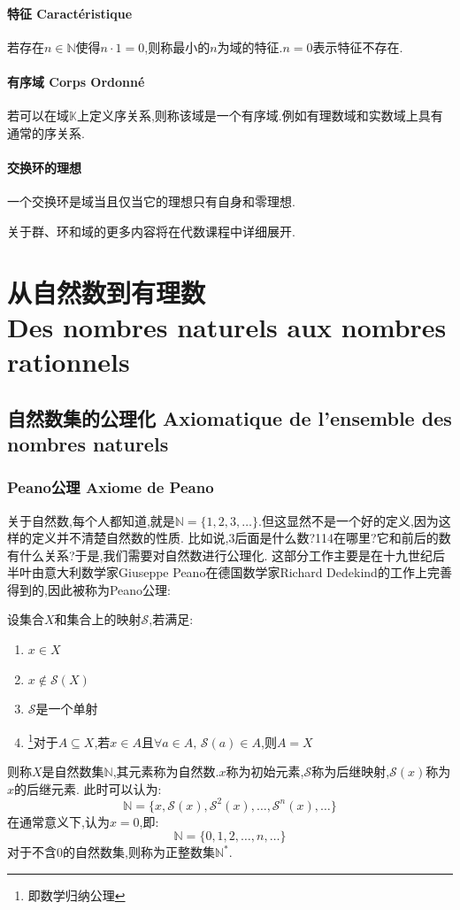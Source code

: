 \documentclass[12pt, a4paper, oneside]{ctexbook}
\newcommand{\N }{\mathbb{N}}%
\renewcommand{\S}{\mathcal{S}}%
\newcommand{\n }{$n$}\newcommand{\f  }{$ f $}
\begin{document}
  \subsubsection{特征 Caractéristique}    \label{myref:tezheng}
  若存在$n\in \mathbb{N}$使得$n\cdot 1=0$,则称最小的\n 为域的特征.$n=0$表示特征不存在.
  \subsubsection{有序域 Corps Ordonné}
  若可以在域$\mathbb{K}$上定义序关系,则称该域是一个有序域.例如有理数域和实数域上具有通常的序关系.
  \subsubsection{交换环的理想}
  一个交换环是域当且仅当它的理想只有自身和零理想.


  关于群、环和域的更多内容将在代数课程中详细展开.

\chapter{从自然数到有理数\\ Des nombres naturels aux nombres rationnels}
\section{自然数集的公理化 Axiomatique de l'ensemble des nombres naturels}
  \subsection{Peano公理 Axiome de Peano}
  关于自然数,每个人都知道,就是$\N=\{1,2,3,\dots\}$.但这显然不是一个好的定义,因为这样的定义并不清楚自然数的性质.
  比如说,3后面是什么数?114在哪里?它和前后的数有什么关系?于是,我们需要对自然数进行公理化.
  这部分工作主要是在十九世纪后半叶由意大利数学家Giuseppe Peano在德国数学家Richard Dedekind的工作上完善得到的,因此被称为Peano公理:


  设集合$X$和集合上的映射$\S$,若满足:
  \begin{enumerate}
    \item $x\in X$
    \item $x\notin \S(X)$
    \item $\S$是一个单射
    \item \footnote{即数学归纳公理}对于$A\subseteq X$,若$x\in A$且$\forall a\in A,\,\S(a)\in A$,则$A=X$
  \end{enumerate}
  则称$X$是自然数集$\N$,其元素称为自然数.$x$称为初始元素,$\S$称为后继映射,$\S(x)$称为$x$的后继元素.
  此时可以认为:
  $$
  \N=\{x,\S(x),\S^2(x),\dots,\S^n(x),\dots\}
  $$
  在通常意义下,认为$x=0$,即:
  $$
  \N=\{0,1,2,\dots,n,\dots\}
  $$
  对于不含0的自然数集,则称为正整数集$\N^*$.
\end{document}
